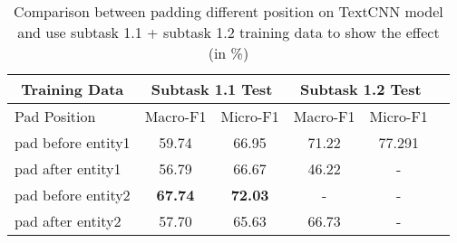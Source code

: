 \begin{table}[htbp!] %
    \begin{tabular}{lccccc}
    \toprule
        \multicolumn{1}{c}{Training Data}          & \multicolumn{2}{c}{Subtask 1.1 Test}  & \multicolumn{2}{c}{Subtask 1.2 Test} \\
    \midrule
        Pad Position                               & Macro-F1         & Micro-F1           & Macro-F1         & Micro-F1       \\
    \midrule
        pad before entity1                         & 59.74            & 66.95              & 71.22            & 77.291         \\
        pad after entity1                          & 56.79            & 66.67              & 46.22            & -              \\
        pad before entity2                         & \bf67.74         & \bf72.03           & -                & -              \\
        pad after entity2                          & 57.70            & 65.63              & 66.73            & -              \\
    \bottomrule
    \end{tabular}
\caption{Comparison between padding different position on TextCNN model and use subtask 1.1 + subtask 1.2 training data to show the effect (in \%)}
\label{tab:data_pad}
\end{table}
